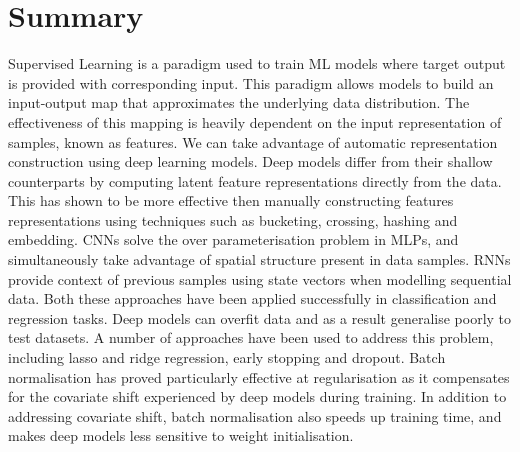 
\section{Summary}

Supervised Learning is a paradigm used to train ML models where target output is provided with corresponding input. This paradigm allows models to build an input-output map that approximates the underlying data distribution. The effectiveness of this mapping is heavily dependent on the input representation of samples, known as features. \newline
We can take advantage of automatic representation construction using deep learning models. Deep models differ from their shallow counterparts by computing latent feature representations directly from the data. This has shown to be more effective then manually constructing features representations using techniques such as bucketing, crossing, hashing and embedding. CNNs solve the over parameterisation problem in MLPs, and simultaneously take advantage of spatial structure present in data samples. RNNs provide context of previous samples using state vectors when modelling sequential data. Both these approaches have been applied successfully in classification and regression tasks. \newline
Deep models can overfit data and as a result generalise poorly to test datasets. A number of approaches have been used to address this problem, including lasso and ridge regression, early stopping and dropout. Batch normalisation has proved particularly effective at regularisation as it compensates for the covariate shift experienced by deep models during training. In addition to addressing covariate shift, batch normalisation also speeds up training time, and makes deep models less sensitive to weight initialisation.
